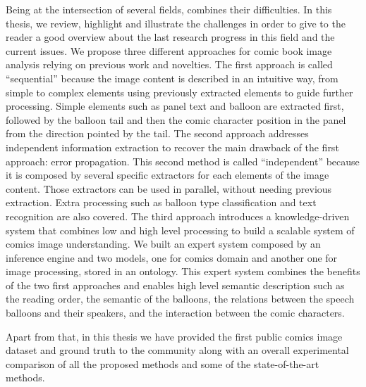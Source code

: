 Being at the intersection of several fields, combines their difficulties.
In this thesis, we review, highlight and illustrate the challenges in order to give to the reader a good overview about the last research progress in this field and the current issues.
We propose three different approaches for comic book image analysis relying on previous work and novelties.
The first approach is called ``sequential'' because the image content is described in an intuitive way, from simple to complex elements using previously extracted elements to guide further processing.
Simple elements such as panel text and balloon are extracted first, followed by the balloon tail and then the comic character position in the panel from the direction pointed by the tail.
The second approach addresses independent information extraction to recover the main drawback of the first approach: error propagation.
This second method is called ``independent'' because it is composed by several specific extractors for each elements of the image content.
Those extractors can be used in parallel, without needing previous extraction.
Extra processing such as balloon type classification and text recognition are also covered.
The third approach introduces a knowledge-driven system that combines low and high level processing to build a scalable system of comics image understanding.
We built an expert system composed by an inference engine and two models, one for comics domain and another one for image processing, stored in an ontology.
This expert system combines the benefits of the two first approaches and enables high level semantic description such as the reading order, the semantic of the balloons, the relations between the speech balloons and their speakers, and the interaction between the comic characters.

Apart from that, in this thesis we have provided the first public comics image dataset and ground truth to the community along with an overall experimental comparison of all the proposed methods and some of the state-of-the-art methods.



